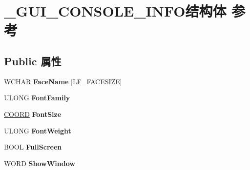 \hypertarget{struct___g_u_i___c_o_n_s_o_l_e___i_n_f_o}{}\section{\+\_\+\+G\+U\+I\+\_\+\+C\+O\+N\+S\+O\+L\+E\+\_\+\+I\+N\+F\+O结构体 参考}
\label{struct___g_u_i___c_o_n_s_o_l_e___i_n_f_o}
\subsection*{Public 属性}
\begin{DoxyCompactItemize}
\item 
\mbox{\label{struct___g_u_i___c_o_n_s_o_l_e___i_n_f_o_a8d0f6b6ba3dc9a3b352567607e42978a}} 
W\+C\+H\+AR {\bfseries Face\+Name} \mbox{[}L\+F\+\_\+\+F\+A\+C\+E\+S\+I\+ZE\mbox{]}
\item 
\mbox{\label{struct___g_u_i___c_o_n_s_o_l_e___i_n_f_o_a8eb75bb1687784a9af5588454ad4b3e5}} 
U\+L\+O\+NG {\bfseries Font\+Family}
\item 
\mbox{\label{struct___g_u_i___c_o_n_s_o_l_e___i_n_f_o_abd0c5ac2f6ad90758007915829b6a0d8}} 
\hyperlink{struct___c_o_o_r_d}{C\+O\+O\+RD} {\bfseries Font\+Size}
\item 
\mbox{\label{struct___g_u_i___c_o_n_s_o_l_e___i_n_f_o_a945eb19fd3157b25c672a367c3633ac9}} 
U\+L\+O\+NG {\bfseries Font\+Weight}
\item 
\mbox{\label{struct___g_u_i___c_o_n_s_o_l_e___i_n_f_o_a9dabe0e6878783ff0f519d9ff7c9d568}} 
B\+O\+OL {\bfseries Full\+Screen}
\item 
\mbox{\label{struct___g_u_i___c_o_n_s_o_l_e___i_n_f_o_ae052da3f64e285a2a64bd248677802a3}} 
W\+O\+RD {\bfseries Show\+Window}
\item 
\mbox{\label{struct___g_u_i___c_o_n_s_o_l_e___i_n_f_o_a47269049b35c94c849d357e395124e0b}} 

\end{DoxyCompactItemize}
